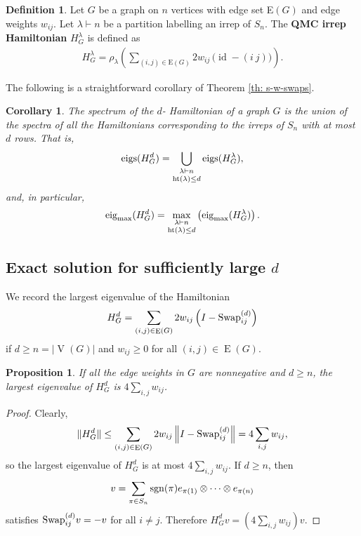 \documentclass[12pt,dvipsnames,accepted=2016-08-18,a4paper,onecolumn]{quantumarticle}
\DeclareMathOperator{\EE}{E}
\DeclareMathOperator{\VV}{V}
\DeclareMathOperator{\het}{ht}
\DeclareMathOperator{\id}{id}
\numberwithin{equation}{section}
\newtheorem{corollary}[theorem]{Corollary}
\newtheorem{proposition}[theorem]{Proposition}
\theoremstyle{definition}
\newtheorem{definition}[theorem]{Definition}
\begin{document}
\begin{definition}
	Let $G$ be a graph on $n$ vertices with edge set E$(G)$ and edge weights $w_{ij}.$ 
Let $\lambda \vdash n$ be a partition labelling an irrep of $S_n.$ The {\bf QMC irrep Hamiltonian} $H_G^{\lambda}$ is defined as
\begin{align*}
	H_G^{\lambda} =  \rho_\lambda \left(
	\sum_{(i,j) \in \text{E}(G)} 
	2w_{ij} \,\big(\id - (i\ j)\big)\right).
\end{align*}
\end{definition}


The following is a straightforward corollary of Theorem \ref{th: s-w-swaps}. 

\begin{corollary}
	The spectrum of the $d$- Hamiltonian of a graph $G$ is the union of the spectra of all the Hamiltonians corresponding to the irreps of $S_n$ with at most $d$ rows. That is,
	$$
	\text{\textnormal{eigs}}(H_G^d) = \bigcup_{\substack{\lambda\vdash n \\[.5mm] \het(\lambda)\le d}} \text{\textnormal{eigs}}(H_G^\lambda),
	$$
	and, in particular,
	$$
	\text{\textnormal{eig}}_{\max}(H_G^d) = \max_{\substack{\lambda\vdash n \\[.5mm] \het(\lambda)\le d}} \left( \text{\textnormal{eig}}_{\max}(H_G^\lambda)  \right).
	$$
\end{corollary}

\subsection{Exact solution for sufficiently large $d$}\label{ssec:larged}

We record the largest eigenvalue of the Hamiltonian
$$H_G^d = \sum_{(i,j) \in \EE(G)} 2 w_{ij} \left(I - \textnormal{Swap}^{(d)}_{ij}\right)
$$
if $d\ge n=|\VV(G)|$ and $w_{ij}\ge0$ for all $(i,j)\in \EE(G)$. 

\begin{proposition}\label{prop:d>n}
If all the edge weights in $G$ are nonnegative and $d\ge n$, the largest eigenvalue of $H_G^d$ is $4\sum_{i,j} w_{ij}$.
\end{proposition}

\begin{proof}
Clearly,
$$
\|H_G^d\| \le \sum_{(i,j) \in \EE(G)} 2 w_{ij} \left\|I - \textnormal{Swap}^{(d)}_{ij}\right\|
=4\sum_{i,j} w_{ij},
$$
so the largest eigenvalue of $H_G^d$ is at most $4\sum_{i,j} w_{ij}$. If $d\ge n$, then
$$v=
\sum_{\pi\in S_n} {\rm sgn}(\pi) e_{\pi(1)}\otimes\cdots\otimes e_{\pi(n)}
$$
satisfies $\textnormal{Swap}^{(d)}_{ij}v=-v$ for all $i\neq j$. Therefore 
$H_G^dv=\left(4\sum_{i,j} w_{ij}\right)v$.
\end{proof}
\end{document}
